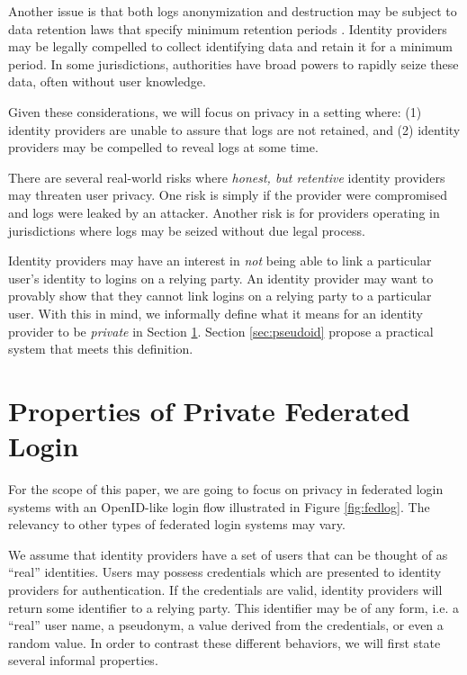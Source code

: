 \documentclass{llncs}
\begin{document}
Another issue is that both logs anonymization and destruction may be
subject to data retention laws that specify minimum retention periods
\cite{EUDir}. Identity providers may be legally compelled to collect
identifying data and retain it for a minimum period. In some
jurisdictions, authorities have broad powers to rapidly seize these
data, often without user knowledge.

Given these considerations, we will focus on privacy in a setting where:
(1) identity providers are unable to assure that logs are not retained, and
(2) identity providers may be compelled to reveal logs at some time.

There are several real-world risks where \emph{honest, but retentive}
identity providers may threaten user privacy. One risk is simply if
the provider were compromised and logs were leaked by an
attacker. Another risk is for providers operating in jurisdictions
where logs may be seized without due legal process.

Identity providers may have an interest in \emph{not} being able to
link a particular user's identity to logins on a relying party. An
identity provider may want to provably show that they cannot link
logins on a relying party to a particular user. With this in mind, we
informally define what it means for an identity provider to be
\emph{private} in Section \ref{sec:private-fed-login}. Section
\ref{sec:pseudoid} propose a practical system that meets this
definition.

\section{Properties of Private Federated Login}
\label{sec:private-fed-login}

For the scope of this paper, we are going to focus on privacy in
federated login systems with an OpenID-like login flow illustrated in
Figure \ref{fig:fedlog}. The relevancy to other types of federated
login systems may vary. 

We assume that identity providers have a set of users that can be
thought of as ``real'' identities. Users may possess credentials which
are presented to identity providers for authentication. If the credentials
are valid, identity providers will return some identifier to a relying
party. This identifier may be of any form, i.e. a ``real'' user name, a
pseudonym, a value derived from the credentials, or even a random
value. In order to contrast these different behaviors, we will first
state several informal properties.
\end{document}
